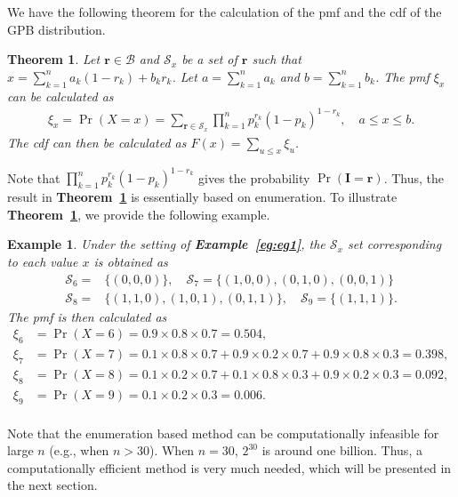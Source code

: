 \documentclass[12pt]{article}
\newcommand{\Ivec}{{\boldsymbol{I}}}
\newcommand{\Bset}{\mathcal{B}}
\newcommand{\Sset}{\mathcal{S}}
\newcommand{\rvec}{\boldsymbol{r}}
\newtheorem{example}{Example}
\newtheorem{thm}{Theorem}
\begin{document}
We have the following theorem for the calculation of the pmf and the cdf of the GPB distribution.
\begin{thm}\label{thm:enum}
Let $\rvec \in \Bset$ and $\Sset_x$ be a set of $\rvec$ such that $ x=\sum_{k=1}^na_k(1-r_k)+b_kr_k$. Let $a=\sum_{k=1}^{n}a_k$ and $b=\sum_{k=1}^{n}b_k$. The pmf $\xi_x$ can be calculated as
\begin{align*}
\xi_x=\Pr(X=x)=\sum_{\rvec\in \Sset_x}\prod_{k=1}^np_k^{r_k}(1-p_k)^{1-r_k}, \quad a\leq x\leq b.
\end{align*}
The cdf can then be calculated as $F(x)=\sum_{u\leq x}\xi_u$.
\end{thm}
Note that $\prod_{k=1}^np_k^{r_k}(1-p_k)^{1-r_k}$ gives the probability $\Pr(\Ivec=\rvec)$. Thus, the result in \textbf{Theorem~\ref{thm:enum}} is essentially based on enumeration. To illustrate \textbf{Theorem~\ref{thm:enum}}, we provide the following example.
\begin{example}
Under the setting of \textbf{Example~\ref{eg:eg1}}, the $\Sset_x$ set corresponding to each value $x$ is obtained as
\begin{align*}
\Sset_6 = & \{(0, 0, 0)\},\quad
\Sset_7 =  \{(1, 0, 0), (0, 1, 0), (0, 0, 1)\}\\
\Sset_8 = & \{(1, 1, 0), (1, 0, 1), (0, 1, 1)\},\quad
\Sset_9 =  \{(1, 1, 1)\}.
\end{align*}
The pmf is then calculated as
\begin{align*}
\xi_6&=\Pr(X = 6) = 0.9\times0.8\times0.7=0.504,\\
\xi_7&=\Pr(X = 7) = 0.1\times0.8\times0.7+0.9\times0.2\times0.7+0.9\times0.8\times0.3=0.398,\\
\xi_8&=\Pr(X = 8) = 0.1\times0.2\times0.7+0.1\times0.8\times0.3+0.9\times0.2\times0.3=0.092,\\
\xi_9&=\Pr(X = 9) = 0.1\times0.2\times0.3=0.006.\\
\end{align*}
\end{example}


Note that the enumeration based method can be computationally infeasible for large $n$ (e.g., when $n>30$). When $n=30$, $2^{30}$ is around one billion. Thus, a computationally efficient method is very much needed, which will be presented in the next section.


\end{document}

